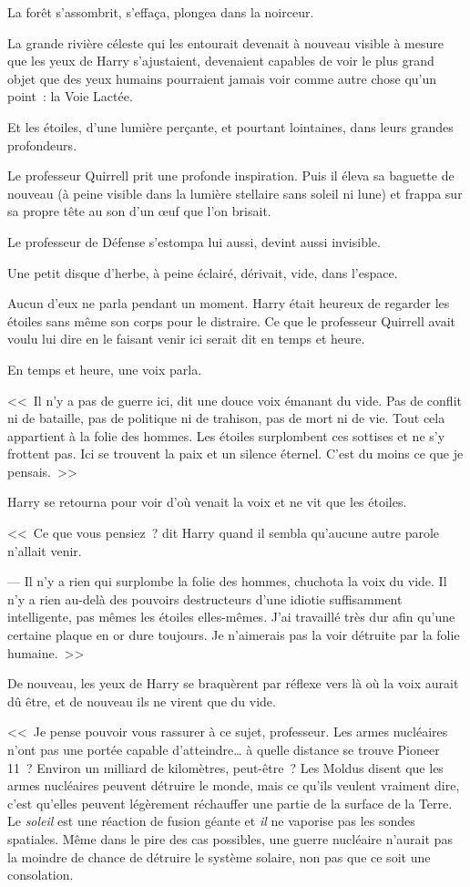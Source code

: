 La forêt s'assombrit, s'effaça, plongea dans la noirceur.

La grande rivière céleste qui les entourait devenait à nouveau visible à mesure que les yeux de Harry s'ajustaient, devenaient capables de voir le plus grand objet que des yeux humains pourraient jamais voir comme autre chose qu'un point~: la Voie Lactée.

Et les étoiles, d'une lumière perçante, et pourtant lointaines, dans leurs grandes profondeurs.

Le professeur Quirrell prit une profonde inspiration. Puis il éleva sa baguette de nouveau (à peine visible dans la lumière stellaire sans soleil ni lune) et frappa sur sa propre tête au son d'un œuf que l'on brisait.

Le professeur de Défense s'estompa lui aussi, devint aussi invisible.

Une petit disque d'herbe, à peine éclairé, dérivait, vide, dans l'espace.

Aucun d'eux ne parla pendant un moment. Harry était heureux de regarder les étoiles sans même son corps pour le distraire. Ce que le professeur Quirrell avait voulu lui dire en le faisant venir ici serait dit en temps et heure.

En temps et heure, une voix parla.

<<~Il n'y a pas de guerre ici, dit une douce voix émanant du vide. Pas de conflit ni de bataille, pas de politique ni de trahison, pas de mort ni de vie. Tout cela appartient à la folie des hommes. Les étoiles surplombent ces sottises et ne s'y frottent pas. Ici se trouvent la paix et un silence éternel. C'est du moins ce que je pensais.~>>

Harry se retourna pour voir d'où venait la voix et ne vit que les étoiles.

<<~Ce que vous pensiez~? dit Harry quand il sembla qu'aucune autre parole n'allait venir.

--- Il n'y a rien qui surplombe la folie des hommes, chuchota la voix du vide. Il n'y a rien au-delà des pouvoirs destructeurs d'une idiotie suffisamment intelligente, pas mêmes les étoiles elles-mêmes. J'ai travaillé très dur afin qu'une certaine plaque en or dure toujours. Je n'aimerais pas la voir détruite par la folie humaine.~>>

De nouveau, les yeux de Harry se braquèrent par réflexe vers là où la voix aurait dû être, et de nouveau ils ne virent que du vide.

<<~Je pense pouvoir vous rassurer à ce sujet, professeur. Les armes nucléaires n'ont pas une portée capable d'atteindre… à quelle distance se trouve Pioneer 11~? Environ un milliard de kilomètres, peut-être~? Les Moldus disent que les armes nucléaires peuvent détruire le monde, mais ce qu'ils veulent vraiment dire, c'est qu'elles peuvent légèrement réchauffer une partie de la surface de la Terre. Le \emph{soleil} est une réaction de fusion géante et \emph{il} ne vaporise pas les sondes spatiales. Même dans le pire des cas possibles, une guerre nucléaire n'aurait pas la moindre de chance de détruire le système solaire, non pas que ce soit une consolation.

